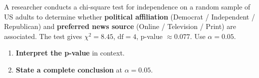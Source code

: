 \documentclass[10pt]{article}
\begin{document}
\namedateperiod

\vspace{0.12in}

A researcher conducts a chi-square test for independence on a random sample of US adults to
determine whether \textbf{political affiliation} (Democrat / Independent / Republican) and
\textbf{preferred news source} (Online / Television / Print) are associated.
The test gives $\chi^2 = 8.45$, $\text{df} = 4$, p-value $\approx 0.077$. Use $\alpha = 0.05$.

\begin{enumerate}[itemsep=14pt]

  \item \textbf{Interpret the p-value} in context.


  \item \textbf{State a complete conclusion} at $\alpha = 0.05$.


\end{enumerate}
\end{document}
